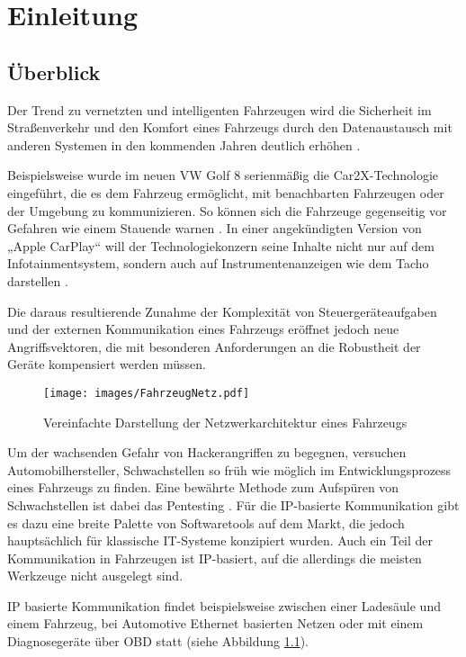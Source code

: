 \chapter{Einleitung}\label{sec:einleitung}
\section{Überblick}\label{sec:ueberblick}

Der Trend zu vernetzten und intelligenten Fahrzeugen wird die Sicherheit im Straßenverkehr und den Komfort eines Fahrzeugs durch den Datenaustausch mit anderen Systemen in den kommenden Jahren deutlich erhöhen \cite[]{transformation}.

Beispielsweise wurde im neuen VW Golf 8 serienmäßig die Car2X-Technologie eingeführt, die es dem Fahrzeug ermöglicht, mit benachbarten Fahrzeugen oder der Umgebung zu kommunizieren. So können sich die Fahrzeuge gegenseitig vor Gefahren wie einem Stauende warnen \cite[]{Rudschies2020}. In einer angekündigten Version von „Apple CarPlay“ will der Technologiekonzern seine Inhalte nicht nur auf dem Infotainmentsystem, sondern auch auf Instrumentenanzeigen wie dem Tacho darstellen \cite[]{Nellis2022}.

Die daraus resultierende Zunahme der Komplexität von Steuergeräteaufgaben und der externen Kommunikation eines Fahrzeugs eröffnet jedoch neue Angriffsvektoren, die mit besonderen Anforderungen an die Robustheit der Geräte kompensiert werden müssen. 

\begin{figure}
	\centering
	\texttt{[image: images/FahrzeugNetz.pdf]}
	\caption{Vereinfachte Darstellung der Netzwerkarchitektur eines Fahrzeugs}
	\label{fig:fahrzeugnetze}
\end{figure}

Um der wachsenden Gefahr von Hackerangriffen zu begegnen, versuchen Automobilhersteller, Schwachstellen so früh wie möglich im Entwicklungsprozess eines Fahrzeugs zu finden. Eine bewährte Methode zum Aufspüren von Schwachstellen ist dabei das Pentesting \cite[]{Ebert2021}. Für die IP-basierte Kommunikation gibt es dazu eine breite Palette von Softwaretools auf dem Markt, die jedoch hauptsächlich für klassische IT-Systeme konzipiert wurden. Auch ein Teil der Kommunikation in Fahrzeugen ist IP-basiert, auf die allerdings die meisten Werkzeuge nicht ausgelegt sind. 

IP basierte Kommunikation findet beispielsweise zwischen einer Ladesäule und einem Fahrzeug, bei Automotive Ethernet basierten Netzen oder mit einem Diagnosegeräte über OBD statt (siehe Abbildung \ref{fig:fahrzeugnetze}).

